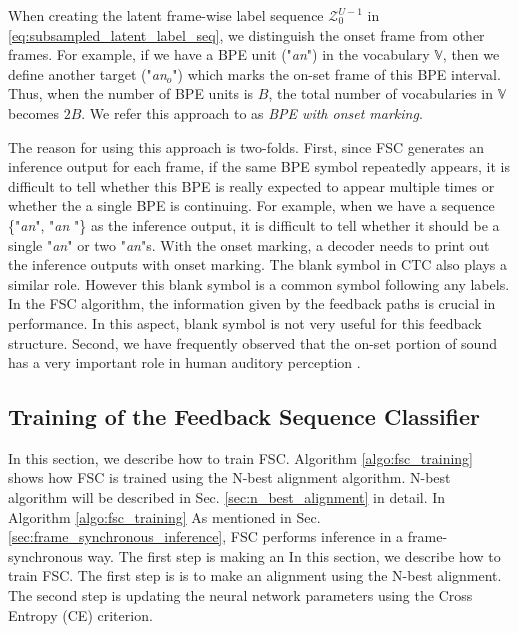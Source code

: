 \documentclass{article}
\begin{document}
When creating the latent frame-wise label sequence $\mathcal{Z}_{0}^{U-1}$ 
in \eqref{eq:subsampled_latent_label_seq}, we distinguish the onset frame
from other frames.  For example, if we have a BPE unit
("{\it an}") in the vocabulary $\mathbb{V}$, then we define another
target ("{\it an$_o$}") which marks the on-set frame of this BPE
interval. Thus, when the number of BPE units is $B$, the total
number of vocabularies in $\mathbb{V}$ becomes $2B$.
We refer this approach to as {\it BPE with onset marking}.

The reason for using this approach is two-folds. First, since FSC
generates an inference output for each frame, if the same
BPE symbol repeatedly appears, it is difficult to tell whether 
this BPE is really expected to appear multiple times or whether 
the a single BPE is continuing. For example, when we have 
a sequence \{"{\it an}", "{\it an} "\}
as the inference output, it is difficult to tell whether it should be a single
"{\it an}" or two "{\it an}"s. With the onset marking,
a decoder needs to print out the inference outputs with onset marking. 
The blank symbol in CTC also plays a similar role. However this blank symbol
is a common symbol following any labels. In the FSC algorithm, the information
given by the feedback paths is crucial in performance. In this aspect,
blank symbol is not very useful for this feedback structure. 
Second, we have frequently observed that the on-set portion of sound
has a very important role in human auditory perception 
\cite{C_Kim_INTERSPEECH_2014_2}.











\subsection{Training of the Feedback Sequence Classifier}
In this section, we describe how to train FSC.  Algorithm 
\ref{algo:fsc_training} shows how FSC is trained using the 
N-best alignment algorithm. N-best algorithm will be described 
in Sec. \ref{sec:n_best_alignment} in detail.
In Algorithm \ref{algo:fsc_training}  
As mentioned in Sec. 
\ref{sec:frame_synchronous_inference}, FSC performs inference
in a frame-synchronous way.
The first step is making an 
In this section, we describe how to train FSC. The first step is 
is to make an alignment using the N-best alignment. The second step is updating the
neural network parameters using the Cross Entropy (CE) criterion. 
\end{document}

